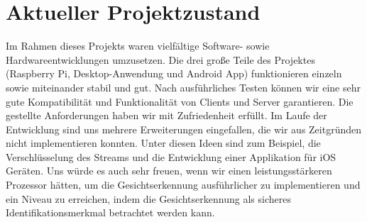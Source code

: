 
\chapter{Aktueller Projektzustand}


Im Rahmen dieses Projekts waren vielfältige Software- sowie Hardwareentwicklungen umzusetzen. Die drei große Teile des Projektes (Raspberry Pi, Desktop-Anwendung und Android App) funktionieren einzeln sowie miteinander stabil und gut. Nach ausführliches Testen können wir eine sehr gute Kompatibilität und Funktionalität von Clients und Server garantieren. Die gestellte Anforderungen haben wir mit Zufriedenheit erfüllt. Im Laufe der Entwicklung sind uns mehrere Erweiterungen eingefallen, die wir aus Zeitgründen nicht implementieren konnten. Unter diesen Ideen sind zum Beispiel, die Verschlüsselung des Streams und die Entwicklung einer Applikation für iOS Geräten. Uns würde es auch sehr freuen, wenn wir einen leistungsstärkeren Prozessor hätten, um die Gesichtserkennung ausführlicher zu implementieren und ein Niveau zu erreichen, indem die Gesichtserkennung als sicheres Identifikationsmerkmal betrachtet werden kann.
